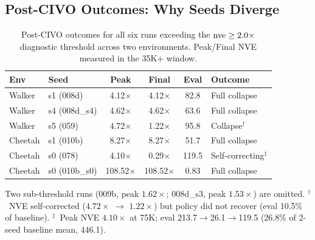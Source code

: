 \subsection{Post-CIVO Outcomes: Why Seeds Diverge}
\label{sec:seed_divergence}

\begin{table}[ht]
\centering
\caption{Post-CIVO outcomes for all six runs exceeding the $\mathrm{nve} \geq 2.0\times$ diagnostic threshold across two environments. Peak/Final NVE measured in the 35K+ window.}
\label{tab:post_civo}
\footnotesize
\setlength{\tabcolsep}{3pt}
\begin{tabular}{llcccl}
\toprule
\textbf{Env} & \textbf{Seed} & \textbf{Peak} & \textbf{Final} & \textbf{Eval} & \textbf{Outcome} \\
\midrule
Walker & s1 (008d) & 4.12$\times$ & 4.12$\times$ & 82.8 & Full collapse \\
Walker & s4 (008d\_s4) & 4.62$\times$ & 4.62$\times$ & 63.6 & Full collapse \\
Walker & s5 (059) & 4.72$\times$ & 1.22$\times$ & 95.8 & Collapse$^\dagger$ \\
\midrule
Cheetah & s1 (010b) & 8.27$\times$ & 8.27$\times$ & 51.7 & Full collapse \\
Cheetah & s0 (078) & 4.10$\times$ & 0.29$\times$ & 119.5 & Self-correcting$^\ddagger$ \\
Cheetah & s0 (010b\_s0) & 108.52$\times$ & 108.52$\times$ & 0.83 & Full collapse \\
\bottomrule
\end{tabular}
\vspace{1pt}
{\raggedright\footnotesize Two sub-threshold runs (009b, peak $1.62\times$; 008d\_s3, peak $1.53\times$) are omitted. $^\dagger$~NVE self-corrected ($4.72\times$ $\to$ $1.22\times$) but policy did not recover (eval 10.5\% of baseline). $^\ddagger$~Peak NVE $4.10\times$ at 75K; eval 213.7$\to$26.1$\to$119.5 (26.8\% of 2-seed baseline mean, 446.1).\par}
\end{table}

